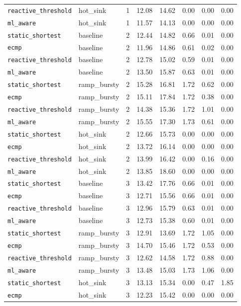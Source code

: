 \begin{longtable}{llcrrrrr}
\texttt{reactive\_threshold} & hot\_sink & 1 & 12.08 & 14.62 & 0.00 & 0.00 & 0.00 \\
\texttt{ml\_aware} & hot\_sink & 1 & 11.57 & 14.13 & 0.00 & 0.00 & 0.00 \\
\midrule
\texttt{static\_shortest} & baseline & 2 & 12.44 & 14.82 & 0.66 & 0.01 & 0.00 \\
\texttt{ecmp} & baseline & 2 & 11.96 & 14.86 & 0.61 & 0.02 & 0.00 \\
\texttt{reactive\_threshold} & baseline & 2 & 12.78 & 15.02 & 0.59 & 0.01 & 0.00 \\
\texttt{ml\_aware} & baseline & 2 & 13.50 & 15.87 & 0.63 & 0.01 & 0.00 \\
\texttt{static\_shortest} & ramp\_bursty & 2 & 15.28 & 16.81 & 1.72 & 0.62 & 0.00 \\
\texttt{ecmp} & ramp\_bursty & 2 & 15.11 & 17.84 & 1.72 & 0.38 & 0.00 \\
\texttt{reactive\_threshold} & ramp\_bursty & 2 & 14.38 & 15.36 & 1.72 & 1.01 & 0.00 \\
\texttt{ml\_aware} & ramp\_bursty & 2 & 15.55 & 17.30 & 1.73 & 0.61 & 0.00 \\
\texttt{static\_shortest} & hot\_sink & 2 & 12.66 & 15.73 & 0.00 & 0.00 & 0.00 \\
\texttt{ecmp} & hot\_sink & 2 & 13.72 & 16.14 & 0.00 & 0.00 & 0.00 \\
\texttt{reactive\_threshold} & hot\_sink & 2 & 13.99 & 16.42 & 0.00 & 0.16 & 0.00 \\
\texttt{ml\_aware} & hot\_sink & 2 & 13.85 & 18.60 & 0.00 & 0.00 & 0.00 \\
\midrule
\texttt{static\_shortest} & baseline & 3 & 13.42 & 17.76 & 0.66 & 0.01 & 0.00 \\
\texttt{ecmp} & baseline & 3 & 12.71 & 15.56 & 0.66 & 0.01 & 0.00 \\
\texttt{reactive\_threshold} & baseline & 3 & 12.96 & 15.79 & 0.63 & 0.01 & 0.00 \\
\texttt{ml\_aware} & baseline & 3 & 12.73 & 15.38 & 0.60 & 0.01 & 0.00 \\
\texttt{static\_shortest} & ramp\_bursty & 3 & 12.91 & 13.69 & 1.72 & 1.05 & 0.00 \\
\texttt{ecmp} & ramp\_bursty & 3 & 14.70 & 15.46 & 1.72 & 0.53 & 0.00 \\
\texttt{reactive\_threshold} & ramp\_bursty & 3 & 12.62 & 14.58 & 1.72 & 0.88 & 0.00 \\
\texttt{ml\_aware} & ramp\_bursty & 3 & 13.48 & 15.03 & 1.73 & 1.06 & 0.00 \\
\texttt{static\_shortest} & hot\_sink & 3 & 13.13 & 15.34 & 0.00 & 0.47 & 1.85 \\
\texttt{ecmp} & hot\_sink & 3 & 12.23 & 15.42 & 0.00 & 0.00 & 0.00 \\
\end{longtable}

